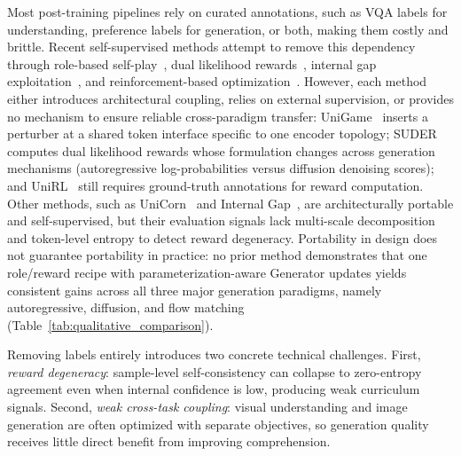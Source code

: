 Most post-training pipelines rely on curated annotations, such as VQA labels for understanding, preference labels for generation, or both, making them costly and brittle. Recent self-supervised methods attempt to remove this dependency through role-based self-play~\citep{su2025unigame, han2026unicorn}, dual likelihood rewards~\citep{hong2025dualselfrewards}, internal gap exploitation~\citep{han2025internalgap}, and reinforcement-based optimization~\citep{mao2025unirl}. However, each method either introduces architectural coupling, relies on external supervision, or provides no mechanism to ensure reliable cross-paradigm transfer: UniGame~\citep{su2025unigame} inserts a perturber at a shared token interface specific to one encoder topology; SUDER~\citep{hong2025dualselfrewards} computes dual likelihood rewards whose formulation changes across generation mechanisms (autoregressive log-probabilities versus diffusion denoising scores); and UniRL~\citep{mao2025unirl} still requires ground-truth annotations for reward computation. Other methods, such as UniCorn~\citep{han2026unicorn} and Internal Gap~\citep{han2025internalgap}, are architecturally portable and self-supervised, but their evaluation signals lack multi-scale decomposition and token-level entropy to detect reward degeneracy. Portability in design does not guarantee portability in practice: no prior method demonstrates that one role/reward recipe with parameterization-aware Generator updates yields consistent gains across all three major generation paradigms, namely autoregressive, diffusion, and flow matching (Table~\ref{tab:qualitative_comparison}).

Removing labels entirely introduces two concrete technical challenges. First, \emph{reward degeneracy}: sample-level self-consistency can collapse to zero-entropy agreement even when internal confidence is low, producing weak curriculum signals. Second, \emph{weak cross-task coupling}: visual understanding and image generation are often optimized with separate objectives, so generation quality receives little direct benefit from improving comprehension.

